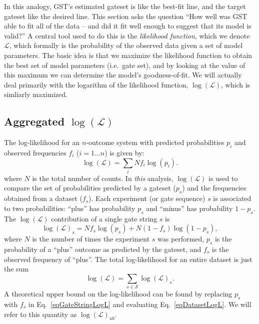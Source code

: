 \documentclass{article}[11pt]
\begin{document}
In this analogy, GST's estimated gateset is like the best-fit line, and the target gateset like the desired line.  This section asks the question ``How well was GST able to fit all of the data -- and did it fit well enough to suggest that its model is valid?'' A central tool used to do this is the \emph{likelihood function}, which we denote $\mathcal{L}$, which formally is the probability of the observed data given a set of model parameters.  The basic idea is that we maximize the likelihood function to obtain the best set of model parameters (i.e.~gate set), and by looking at the value of this maximum we can determine the model's goodness-of-fit.  We will actually deal primarily with the logarithm of the likelihood function, $\log(\mathcal{L})$, which is simliarly maximized.

\subsection{Aggregated $\log(\mathcal{L})$}

The log-likelihood for an $n$-outcome system with predicted probabilities $p_i$ and observed frequencies $f_i$ ($i=1\ldots n$) is given by:
\begin{equation}
\log(\mathcal{L}) = \sum_i N f_i \log(p_i).
\end{equation}
where $N$ is the total number of counts. In \emph{this} analysis, $\log(\mathcal{L})$ is used to compare the set of probabilities predicted by a gateset ($p_s$) and the frequencies obtained from a dataset ($f_s$).  Each experiment (or gate sequence) $s$ is associated to two probabilities:  ``plus'' has probability $p_s$ and ``minus'' has probability $1-p_s$.  The $\log(\mathcal{L})$ contribution of a single gate string $s$ is
\begin{equation}
\log(\mathcal{L})_s = N f_s \log(p_s) + N (1-f_s) \log(1-p_s),\label{eqGateStringLogL}
\end{equation}
where $N$ is the number of times the experiment $s$ was performed, $p_s$ is the probability of a ``plus'' outcome as predicted by the gateset, and $f_s$ is the observed frequency of ``plus''.  The total log-likelihood for an entire dataset is just the sum 
\begin{equation}
\log(\mathcal{L}) = \sum_{s\in\mathcal{S}}{ \log(\mathcal{L})_s}.\label{eqDatasetLogL}
\end{equation}
A theoretical upper bound on the log-likelihood can be found by replacing $p_s$ with $f_s$ in Eq.~\ref{eqGateStringLogL} and evaluating Eq.~\ref{eqDatasetLogL}.  We will refer to this quantity as $\log(\mathcal{L})_{ub}$.
\end{document}
